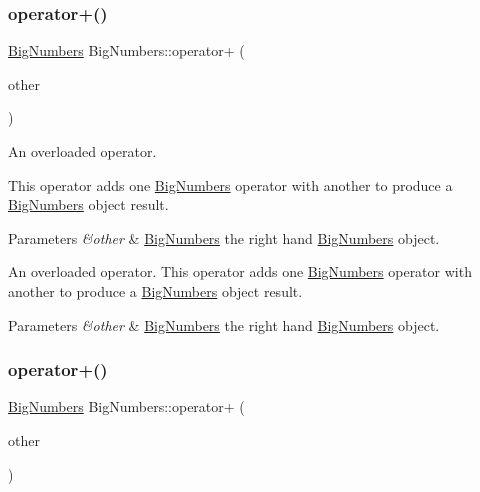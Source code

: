 \subsubsection{\texorpdfstring{operator+()}{operator+()}\hspace{0.1cm}{\footnotesize\ttfamily [1/2]}}
{\footnotesize\ttfamily \mbox{\hyperlink{class_big_numbers}{Big\+Numbers}} Big\+Numbers\+::operator+ (\begin{DoxyParamCaption}\item[{\mbox{\hyperlink{class_big_numbers}{Big\+Numbers}} \&}]{other }\end{DoxyParamCaption})}



An overloaded operator. 

This operator adds one \mbox{\hyperlink{class_big_numbers}{Big\+Numbers}} operator with another to produce a \mbox{\hyperlink{class_big_numbers}{Big\+Numbers}} object result. 
\begin{DoxyParams}{Parameters}
{\em \&other} & \mbox{\hyperlink{class_big_numbers}{Big\+Numbers}} the right hand \mbox{\hyperlink{class_big_numbers}{Big\+Numbers}} object.\\
\hline
\end{DoxyParams}
An overloaded operator. This operator adds one \mbox{\hyperlink{class_big_numbers}{Big\+Numbers}} operator with another to produce a \mbox{\hyperlink{class_big_numbers}{Big\+Numbers}} object result. 
\begin{DoxyParams}{Parameters}
{\em \&other} & \mbox{\hyperlink{class_big_numbers}{Big\+Numbers}} the right hand \mbox{\hyperlink{class_big_numbers}{Big\+Numbers}} object. \\
\hline
\end{DoxyParams}
\mbox{\label{class_big_numbers_a577623597af4ede2c93fd076e9ea0a38}} 
\subsubsection{\texorpdfstring{operator+()}{operator+()}\hspace{0.1cm}{\footnotesize\ttfamily [2/2]}}
{\footnotesize\ttfamily \mbox{\hyperlink{class_big_numbers}{Big\+Numbers}} Big\+Numbers\+::operator+ (\begin{DoxyParamCaption}\item[{int}]{other }\end{DoxyParamCaption})}



